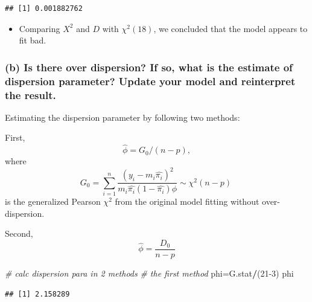 \documentclass[
]{article}
\newenvironment{Shaded}{\begin{snugshade}}{\end{snugshade}}
\newcommand{\CommentTok}[1]{\textcolor[rgb]{0.56,0.35,0.01}{\textit{#1}}}
\newcommand{\DecValTok}[1]{\textcolor[rgb]{0.00,0.00,0.81}{#1}}
\newcommand{\NormalTok}[1]{#1}
\newcommand{\OtherTok}[1]{\textcolor[rgb]{0.56,0.35,0.01}{#1}}
\newcommand{\SpecialCharTok}[1]{\textcolor[rgb]{0.81,0.36,0.00}{\textbf{#1}}}
\providecommand{\tightlist}{%
  \setlength{\itemsep}{0pt}\setlength{\parskip}{0pt}}
\begin{document}
\begin{verbatim}
## [1] 0.001882762
\end{verbatim}

\begin{itemize}
\tightlist
\item
  Comparing \(X^2\) and \(D\) with \(\chi^2(18)\), we concluded that the
  model appears to fit bad.
\end{itemize}

\hypertarget{b-is-there-over-dispersion-if-so-what-is-the-estimate-of-dispersion-parameter-update-your-model-and-reinterpret-the-result.}{%
\subsubsection{(b) Is there over dispersion? If so, what is the estimate
of dispersion parameter? Update your model and reinterpret the
result.}\label{b-is-there-over-dispersion-if-so-what-is-the-estimate-of-dispersion-parameter-update-your-model-and-reinterpret-the-result.}}

Estimating the dispersion parameter by following two methods:

First,\[\hat{\phi} = G_0/(n-p),\] where
\[G_0 = \sum_{i=1}^{n}{\frac{(y_i-m_i \hat{\pi_i})^2}{m_i\hat{\pi_i}(1-\hat{\pi_i})\phi}} \sim \chi^2(n-p)\ \]
is the generalized Pearson \(\chi^2\) from the original model fitting
without over-dispersion.

Second, \[\hat{\phi} = \frac{D_0}{n-p}\]

\begin{Shaded}
\begin{Highlighting}[]
\CommentTok{\# calc dispersion para in 2 methods}
\CommentTok{\# the first method}
\NormalTok{phi}\OtherTok{=}\NormalTok{G.stat}\SpecialCharTok{/}\NormalTok{(}\DecValTok{21{-}3}\NormalTok{)}
\NormalTok{phi}
\end{Highlighting}
\end{Shaded}

\begin{verbatim}
## [1] 2.158289
\end{verbatim}

\begin{Shaded}
\end{Shaded}
\end{document}
